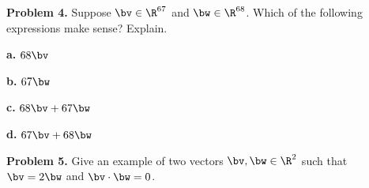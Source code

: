 \documentclass[oneside,12pt]{amsart}
\begin{document}
\textbf{Problem 4.} Suppose $\bv\in\R^{67}$ and $\bw\in\R^{68}$.  Which of
the following expressions make sense? Explain.

\bigskip

\textbf{a.} $68 \bv$

\bigskip

\textbf{b.} $67 \bw$

\bigskip

\textbf{c.} $68 \bv + 67 \bw$

\bigskip

\textbf{d.} $67 \bv + 68 \bw$

\bigskip

\textbf{Problem 5.} Give an example of two vectors $\bv, \bw \in \R^2$
such that $\bv = 2 \bw$ and $\bv \cdot \bw = 0$.
\end{document}
